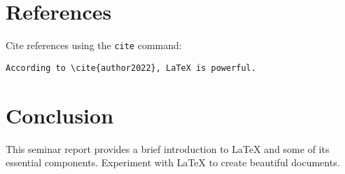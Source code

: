 \section{References}
Cite references using the \texttt{cite} command:
\begin{verbatim}
According to \cite{author2022}, LaTeX is powerful.
\end{verbatim}

\section{Conclusion}
This seminar report provides a brief introduction to LaTeX and some of its essential components. Experiment with LaTeX to create beautiful documents.

